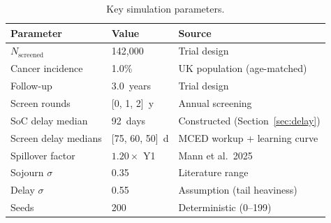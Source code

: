 \documentclass[11pt,letter]{article}
\begin{document}
\begin{table}[!ht]\centering
\caption{Key simulation parameters.}
\label{tab:params}
\begin{tabular}{p{}p{}p{}}\toprule
Parameter & Value & Source \\ \midrule
$N_{\text{screened}}$ & 142,000 & Trial design \\
Cancer incidence & 1.0\% & UK population (age-matched) \\
Follow-up & 3.0~years & Trial design \\
Screen rounds & [0, 1, 2]~y & Annual screening \\
SoC delay median & 92~days & Constructed (Section~\ref{sec:delay}) \\
Screen delay medians & [75, 60, 50]~d & MCED workup + learning curve \\
Spillover factor & $1.20\times$ Y1 & Mann et al.\ 2025 \cite{Mann2025} \\
Sojourn $\sigma$ & 0.35 & Literature range \\
Delay $\sigma$ & 0.55 & Assumption (tail heaviness) \\
Seeds & 200 & Deterministic (0--199) \\
\bottomrule
\end{tabular}
\end{table}
\end{document}
